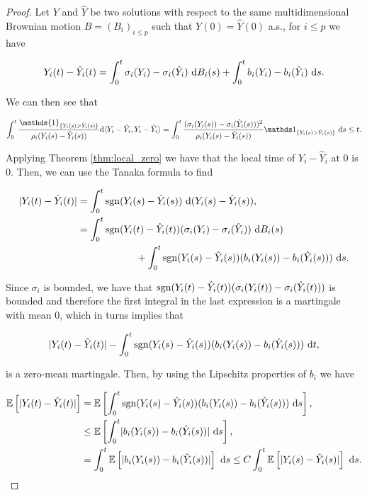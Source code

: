 \begin{proof}
    Let $Y$ and $\hat Y$ be two solutions with respect to the same multidimensional Brownian motion $B = (B_i)_{i \le p}$ such that $Y(0) = \hat Y(0)$ %
    a.s., for $i\le p$ we have

    \begin{equation}
        Y_i(t) - \hat Y_i(t) = \int_0^t \sigma_i(Y_i) - \sigma_i(\hat Y_i) ~\mathrm d B_i(s) + \int_0^t b_i(Y_i) - b_i(\hat Y_i) ~\mathrm d s.
    \end{equation}

    We can then see that

    \begin{equation*}
        \int_0^t \frac{\mathds{1}_{\{Y_i(s) > \hat Y_i(s)\}}}{\rho_i(Y_i(s)- \hat Y_i(s))} \d \langle Y_i - \hat Y_i, Y_i - \hat Y_i \rangle = \int_0^t \frac{( \sigma_i (Y_i(s)) - \sigma_i (\hat Y_i(s)) )^2}{\rho_i(Y_i(s) - \hat Y_i(s))} \mathds 1_{\{Y_i(s) > \hat Y_i(s)\}} ~\d s \le t.
    \end{equation*}
    
    Applying Theorem \ref{thm:local_zero} we have that the local time of $Y_i - \hat Y_i$ at 0 is 0. Then, we can use the Tanaka formula to find

    \begin{align*}
        \lvert  Y_i(t) - \hat Y_i(t)  \rvert &= \int_0^t \mathrm{sgn}(Y_i(s) - \hat Y_i(s)) ~\mathrm d( Y_i(s) - \hat Y_i(s) ),\\
        &= \int_0^t \mathrm{sgn}(Y_i(t) - \hat Y_i(t))(\sigma_i(Y_i) - \sigma_i(\hat Y_i)) ~\mathrm d B_i(s)\\
        &\phantom{espacioteeeee}+ \int_0^t \mathrm{sgn}(Y_i(s) - \hat Y_i(s))(b_i(Y_i(s)) - b_i(\hat Y_i(s))) ~ \mathrm d s.
    \end{align*}

    Since $\sigma_i$ is bounded, we have that $\mathrm{sgn}(Y_i(t) - \hat Y_i(t))(\sigma_i(Y_i(t)) - \sigma_i(\hat Y_i(t)))$ is bounded and therefore the first integral in the last expression is a martingale with mean 0, which in turns implies that

    \begin{equation*}
        \lvert  Y_i(t) - \hat Y_i(t)  \rvert - \int_0^t \mathrm{sgn}(Y_i(s) - \hat Y_i(s))(b_i(Y_i(s)) - b_i(\hat Y_i(s)))~\mathrm d t,
    \end{equation*}

    \noindent is a zero-mean martingale. Then, by using the Lipschitz properties of $b_i$ we have

    \begin{align*}
        \mathbb E \left[ \lvert Y_i(t) - \hat Y_i(t) \rvert \right] &= \mathbb E \left[   \int_0^t \mathrm{sgn}(Y_i(s) - \hat Y_i(s))(b_i(Y_i(s)) - b_i(\hat Y_i(s)))~\mathrm d s  \right],\\
        &\le \mathbb E \left[  \int_0^t \lvert b_i(Y_i(s)) - b_i(\hat Y_i(s)) \rvert~\mathrm d s \right],\\
        &= \int_0^t \mathbb E \left[  \lvert  b_i(Y_i(s)) - b_i(\hat Y_i(s))  \rvert  \right]~\mathrm d s 
        \le  C\int_0^t \mathbb E \left[ \lvert Y_i(s) - \hat Y_i(s) \rvert \right]~\mathrm d s.
    \end{align*}


\end{proof}

